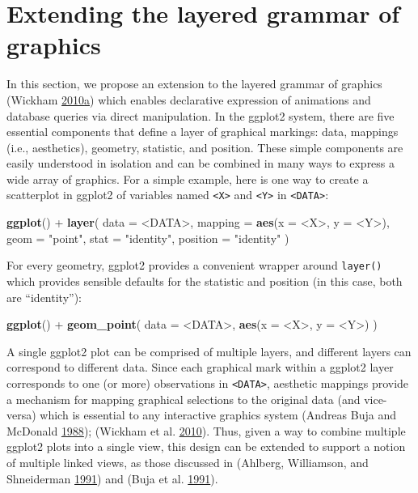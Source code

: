 \documentclass[12pt,]{isuthesis}
\newenvironment{Shaded}{\begin{snugshade}}{\end{snugshade}}
\newcommand{\KeywordTok}[1]{\textcolor[rgb]{0.13,0.29,0.53}{\textbf{{#1}}}}
\newcommand{\DataTypeTok}[1]{\textcolor[rgb]{0.13,0.29,0.53}{{#1}}}
\newcommand{\StringTok}[1]{\textcolor[rgb]{0.31,0.60,0.02}{{#1}}}
\newcommand{\NormalTok}[1]{{#1}}
\begin{document}
\section{Extending the layered grammar of graphics}

In this section, we propose an extension to the layered grammar of
graphics (Wickham
\protect\hyperlink{ref-ggplot2-paper}{2010}\protect\hyperlink{ref-ggplot2-paper}{a})
which enables declarative expression of animations and database queries
via direct manipulation. In the ggplot2 system, there are five essential
components that define a layer of graphical markings: data, mappings
(i.e., aesthetics), geometry, statistic, and position. These simple
components are easily understood in isolation and can be combined in
many ways to express a wide array of graphics. For a simple example,
here is one way to create a scatterplot in ggplot2 of variables named
\texttt{<X>} and \texttt{<Y>} in \texttt{<DATA>}:

\begin{Shaded}
\begin{Highlighting}[]
\KeywordTok{ggplot}\NormalTok{() +}\StringTok{ }\KeywordTok{layer}\NormalTok{(}
  \DataTypeTok{data =} \NormalTok{<DATA>, }
  \DataTypeTok{mapping =} \KeywordTok{aes}\NormalTok{(}\DataTypeTok{x =} \NormalTok{<X>, }\DataTypeTok{y =} \NormalTok{<Y>), }
  \DataTypeTok{geom =} \StringTok{"point"}\NormalTok{, }
  \DataTypeTok{stat =} \StringTok{"identity"}\NormalTok{,}
  \DataTypeTok{position =} \StringTok{"identity"}
\NormalTok{)}
\end{Highlighting}
\end{Shaded}

For every geometry, ggplot2 provides a convenient wrapper around
\texttt{layer()} which provides sensible defaults for the statistic and
position (in this case, both are ``identity''):

\begin{Shaded}
\begin{Highlighting}[]
\KeywordTok{ggplot}\NormalTok{() +}\StringTok{ }\KeywordTok{geom_point}\NormalTok{(}
  \DataTypeTok{data =} \NormalTok{<DATA>, }
  \KeywordTok{aes}\NormalTok{(}\DataTypeTok{x =} \NormalTok{<X>, }\DataTypeTok{y =} \NormalTok{<Y>)}
\NormalTok{)}
\end{Highlighting}
\end{Shaded}

A single ggplot2 plot can be comprised of multiple layers, and different
layers can correspond to different data. Since each graphical mark
within a ggplot2 layer corresponds to one (or more) observations in
\texttt{<DATA>}, aesthetic mappings provide a mechanism for mapping
graphical selections to the original data (and vice-versa) which is
essential to any interactive graphics system (Andreas Buja and McDonald
\protect\hyperlink{ref-viewing-pipeline}{1988}); (Wickham et al.
\protect\hyperlink{ref-plumbing}{2010}). Thus, given a way to combine
multiple ggplot2 plots into a single view, this design can be extended
to support a notion of multiple linked views, as those discussed in
(Ahlberg, Williamson, and Shneiderman
\protect\hyperlink{ref-Ahlberg:1991}{1991}) and (Buja et al.
\protect\hyperlink{ref-Buja:1991vh}{1991}).
\end{document}
